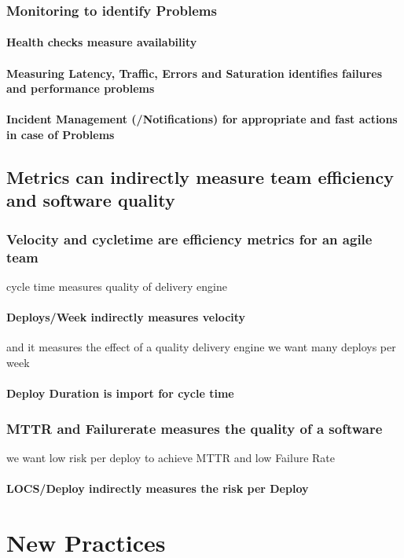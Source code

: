 \section{Monitoring to identify Problems}
\subsection{Health checks measure availability}
\subsection{Measuring Latency, Traffic, Errors and Saturation identifies failures and performance problems}
\subsection{Incident Management (/Notifications) for appropriate and fast actions in case of Problems}

\chapter{Metrics can indirectly measure team efficiency and software quality}
\section{Velocity and cycletime are efficiency metrics for an agile team}
cycle time measures quality of delivery engine
\subsection{Deploys/Week indirectly measures velocity}
and it measures the effect of a quality delivery engine
we want many deploys per week
\subsection{Deploy Duration is import for cycle time}
\section{MTTR and Failurerate measures the quality of a software}
we want low risk per deploy to achieve MTTR and low Failure Rate
\subsection{LOCS/Deploy indirectly measures the risk per Deploy}


\part{New Practices}

